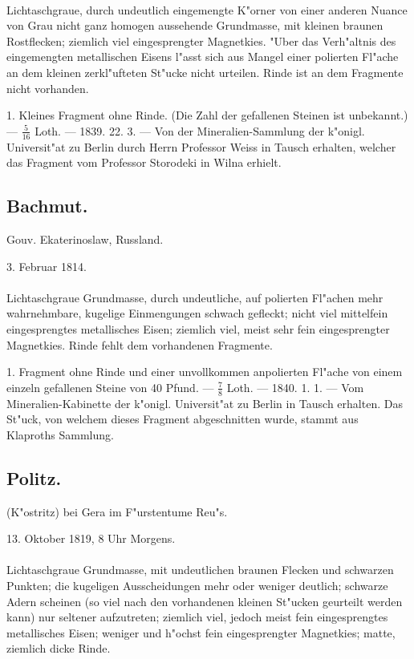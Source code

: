 \documentclass[a4paper, 11pt, oneside, polutonikogreek, german]{article}
\begin{document}
\paragraph{}
Lichtaschgraue, durch undeutlich eingemengte K"orner von einer anderen Nuance von Grau nicht ganz homogen aussehende Grundmasse, mit kleinen braunen Rostflecken; ziemlich viel eingesprengter Magnetkies. "Uber das Verh"altnis des eingemengten metallischen Eisens l"asst sich aus Mangel einer polierten Fl"ache an dem kleinen zerkl"ufteten St"ucke nicht urteilen. Rinde ist an dem Fragmente nicht vorhanden.

1. Kleines Fragment ohne Rinde. (Die Zahl der gefallenen Steinen ist unbekannt.) --- $\frac{5}{16}$ Loth. --- 1839. 22. 3. --- Von der Mineralien-Sammlung der k"onigl. Universit"at zu Berlin durch Herrn Professor Weiss in Tausch erhalten, welcher das Fragment vom Professor Storodeki in Wilna erhielt.
\subsection{Bachmut.}
\begin{center}
\small
Gouv. Ekaterinoslaw, Russland.

3. Februar 1814.
\end{center}
\paragraph{}
Lichtaschgraue Grundmasse, durch undeutliche, auf polierten Fl"achen mehr wahrnehmbare, kugelige Einmengungen schwach gefleckt; nicht viel mittelfein eingesprengtes metallisches Eisen; ziemlich viel, meist sehr fein eingesprengter Magnetkies. Rinde fehlt dem vorhandenen Fragmente.

1. Fragment ohne Rinde und einer unvollkommen anpolierten Fl"ache von einem einzeln gefallenen Steine von 40 Pfund. --- $\frac{7}{8}$ Loth. --- 1840. 1. 1. --- Vom Mineralien-Kabinette der k"onigl. Universit"at zu Berlin in Tausch erhalten. Das St"uck, von welchem dieses Fragment abgeschnitten wurde, stammt aus Klaproths Sammlung.
\subsection{Politz.}
\begin{center}
\small
(K"ostritz) bei Gera im F"urstentume Reu"s.

13. Oktober 1819, 8 Uhr Morgens.
\end{center}
\paragraph{}
Lichtaschgraue Grundmasse, mit undeutlichen braunen Flecken und schwarzen Punkten; die kugeligen Ausscheidungen mehr oder weniger deutlich; schwarze Adern scheinen (so viel nach den vorhandenen kleinen St"ucken geurteilt werden kann) nur seltener aufzutreten; ziemlich viel, jedoch meist fein eingesprengtes metallisches Eisen; weniger und h"ochst fein eingesprengter Magnetkies; matte, ziemlich dicke Rinde.
\end{document}
